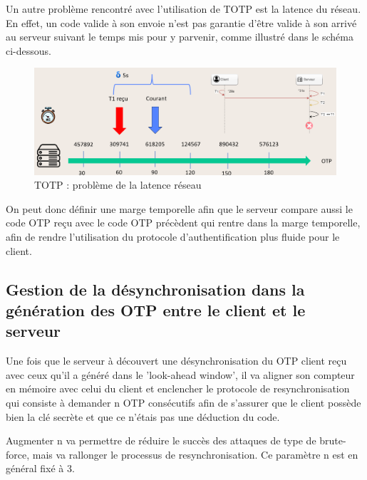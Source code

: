 \documentclass[a4paper, 10pt]{article}
\newcommand{\otp}{\textsc{OTP} }
\newcommand{\totp}{\textsc{TOTP} }
\begin{document}
    Un autre problème rencontré avec l'utilisation de \totp est la \textcolor{myblue}{latence du réseau}. 
En effet, un code valide à son envoie \textcolor{myblue}{n'est pas garantie d'être valide à son arrivé} au serveur suivant le temps mis pour y parvenir, comme illustré dans le schéma ci-dessous.

\begin{figure}[H]
        \centering
        \includegraphics[scale=0.45]{img/1/3/totp_latence.png}
        \caption{\totp: problème de la latence réseau\\}
        \label{fig:totp-latence}
\end{figure}

    
    On peut donc définir une \textcolor{mygreen}{marge temporelle} afin que le serveur compare aussi le code \otp reçu avec le code \otp précèdent
qui rentre dans la marge temporelle, afin de rendre l'utilisation du protocole d'authentification plus fluide pour le client.



        \subsection{Gestion de la désynchronisation dans la génération des \otp entre le client et le serveur}


    Une fois que le serveur à \textcolor{myblue}{découvert une désynchronisation} du \otp client reçu avec ceux qu'il a généré dans le 'look-ahead window',
il va aligner son compteur en mémoire avec celui du client et \textcolor{mygreen}{enclencher le protocole de resynchronisation} qui consiste à \textcolor{mygreen}{demander n \otp consécutifs}
afin de s'assurer que le client possède bien la clé secrète et que ce n'étais pas une déduction du code.
    
    Augmenter n va permettre de réduire le succès des attaques de type de brute-force,
mais va rallonger le processus de resynchronisation. Ce paramètre n est \textcolor{mygreen}{en général fixé à 3}.
\end{document}
